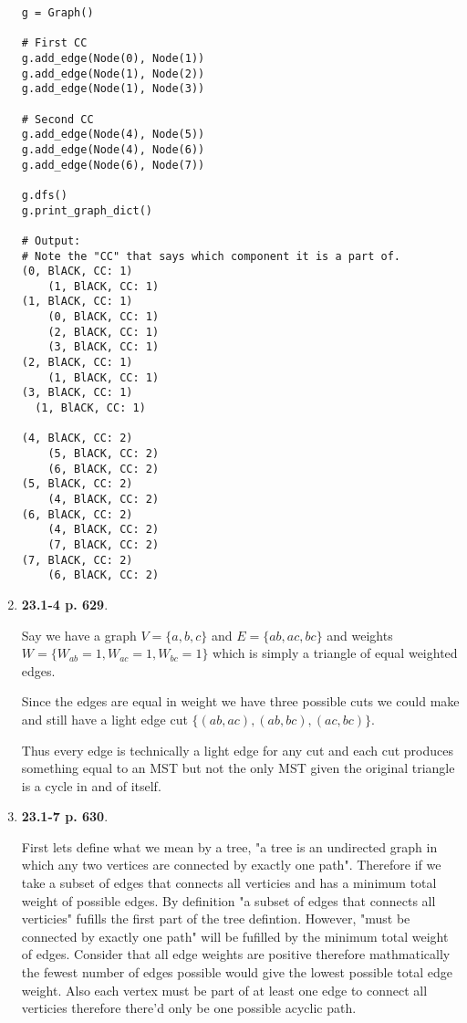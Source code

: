 \documentclass{article}
\begin{document}
\begin{enumerate}
    \begin{lstlisting}
g = Graph()

# First CC
g.add_edge(Node(0), Node(1))
g.add_edge(Node(1), Node(2))
g.add_edge(Node(1), Node(3))

# Second CC
g.add_edge(Node(4), Node(5))
g.add_edge(Node(4), Node(6))
g.add_edge(Node(6), Node(7))

g.dfs()
g.print_graph_dict()

# Output:
# Note the "CC" that says which component it is a part of.
(0, BlACK, CC: 1)
	(1, BlACK, CC: 1)
(1, BlACK, CC: 1)
	(0, BlACK, CC: 1)
	(2, BlACK, CC: 1)
	(3, BlACK, CC: 1)
(2, BlACK, CC: 1)
	(1, BlACK, CC: 1)
(3, BlACK, CC: 1)
  (1, BlACK, CC: 1)
  
(4, BlACK, CC: 2)
	(5, BlACK, CC: 2)
	(6, BlACK, CC: 2)
(5, BlACK, CC: 2)
	(4, BlACK, CC: 2)
(6, BlACK, CC: 2)
	(4, BlACK, CC: 2)
	(7, BlACK, CC: 2)
(7, BlACK, CC: 2)
	(6, BlACK, CC: 2)
    \end{lstlisting}

    \item \textbf{23.1-4 p. 629}.
    
    Say we have a graph $V = \{a, b, c\}$ and $E = \{ab, ac, bc\}$ and weights $W = \{W_{ab} = 1, W_{ac} = 1, W_{bc} = 1\}$ which is simply a triangle of equal weighted edges.  

    Since the edges are equal in weight we have three possible cuts we could make and still have a light edge cut $\{(ab, ac), (ab, bc), (ac, bc)\}$. 

    Thus every edge is technically a light edge for any cut and each cut produces something equal to an MST but not the only MST given the original triangle is a cycle in and of itself.

    \item \textbf{23.1-7 p. 630}.
    
    First lets define what we mean by a tree, "a tree is an undirected graph in which any two vertices are connected by exactly one path". 
    Therefore if we take a subset of edges that connects all verticies and has a minimum total weight of possible edges.
    By definition "a subset of edges that connects all verticies" fufills the first part of the tree defintion. 
    However, "must be connected by exactly one path" will be fufilled by the minimum total weight of edges. Consider that all edge weights are positive therefore mathmatically the fewest number of edges possible would give the lowest possible total edge weight. 
    Also each vertex must be part of at least one edge to connect all verticies therefore there'd only be one possible acyclic path.\\


\end{enumerate}
\end{document}
